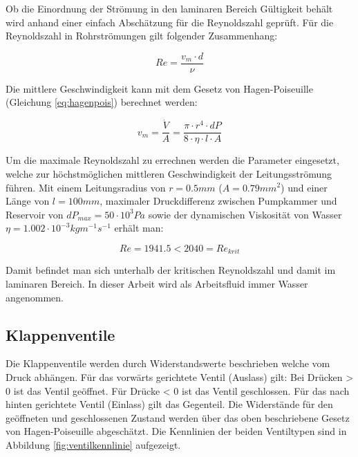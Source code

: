\documentclass[fontsize=12pt, a4paper]{scrartcl}
\begin{document}
Ob die Einordnung der Strömung in den laminaren Bereich Gültigkeit behält wird anhand einer einfach Abschätzung für die Reynoldszahl geprüft. Für die Reynoldszahl in Rohrströmungen gilt folgender Zusammenhang:
 
\begin{equation}
	Re = \frac{v_{m} \cdot d}{\nu}
	\label{eq:reynoldstube}
\end{equation}

Die mittlere Geschwindigkeit kann mit dem Gesetz von Hagen-Poiseuille (Gleichung \ref{eq:hagenpois}) berechnet werden:

\begin{equation}
	v_m = \frac{\dot{V}}{A} = \frac{\pi \cdot r^4 \cdot dP}{8 \cdot \eta \cdot l \cdot A}
	\label{eq:meanvelocity}
\end{equation}

Um die maximale Reynoldszahl zu errechnen werden die Parameter eingesetzt, welche zur höchstmöglichen mittleren Geschwindigkeit der Leitungsströmung führen. Mit einem Leitungsradius von $r=0.5 mm$ ($A=0.79mm^2$) und einer Länge von $l = 100 mm$, maximaler Druckdifferenz zwischen Pumpkammer und Reservoir von $dP_{max} = 50 \cdot 10^{3} Pa$ sowie der dynamischen Viskosität von Wasser $\eta=1.002 \cdot 10^{-3} kg m^{-1} s^{-1}$ erhält man:

\begin{equation}
	Re = 1941.5 < 2040 = Re_{krit}
	\label{eq:Reynoldresult}
\end{equation}

Damit befindet man sich unterhalb der kritischen Reynoldszahl und damit im laminaren Bereich. In dieser Arbeit wird als Arbeitsfluid immer Wasser angenommen.

\subsection{Klappenventile}
\label{subsec:ventilsection}

Die Klappenventile werden durch Widerstandswerte beschrieben welche vom Druck abhängen. Für das vorwärts gerichtete Ventil (Auslass) gilt: Bei Drücken > 0 ist das Ventil geöffnet. Für Drücke < 0 ist das Ventil geschlossen. Für das nach hinten gerichtete Ventil (Einlass) gilt das Gegenteil. Die Widerstände für den geöffneten und geschlossenen Zustand werden über das oben beschriebene Gesetz von Hagen-Poiseuille abgeschätzt. Die Kennlinien der beiden Ventiltypen sind in Abbildung \ref{fig:ventilkennlinie} aufgezeigt.
\end{document}
